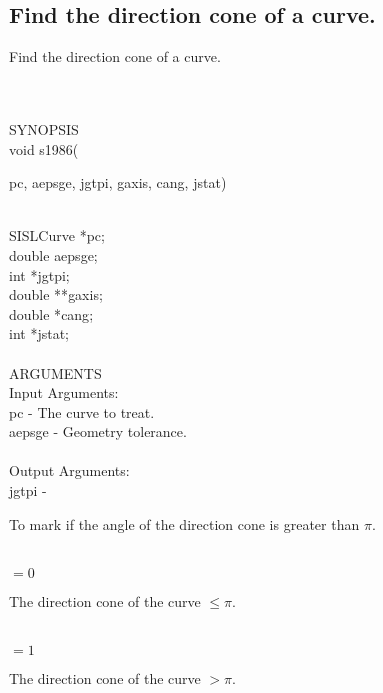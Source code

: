 \subsection{Find the direction cone of a curve.}
\begin{minipg1}
Find the direction cone of a curve.
\end{minipg1} \\ \\
SYNOPSIS\\
        \>void s1986(\begin{minipg3}
          {\fov pc}, {\fov aepsge}, {\fov jgtpi}, {\fov gaxis}, {\fov cang}, {\fov jstat})
        \end{minipg3}\\[0.3ex]
        \>\>    SISLCurve \> *{\fov pc};\\
        \>\>    double    \> {\fov aepsge};\\
        \>\>    int       \> *{\fov jgtpi};\\
        \>\>    double    \> **{\fov gaxis};\\
        \>\>    double    \> *{\fov cang};\\
        \>\>    int       \>  *{\fov jstat};\\
\\
ARGUMENTS\\
        \>Input Arguments:\\
        \>\>    {\fov pc}     \> - \> The curve to treat.\\
        \>\>    {\fov aepsge} \> - \> Geometry tolerance.\\
\\
        \>Output Arguments:\\
        \>\>    {\fov jgtpi} \> - \>
                \begin{minipg2}
                  To mark if the angle of the direction cone is greater than $\pi$.
                \end{minipg2}\\[0.3ex]
                \>\>\>\>\> $= 0$ \begin{minipg5}
                                   The direction cone of the curve $\leq\pi$.
                                 \end{minipg5}\\[0.3ex]
                \>\>\>\>\> $= 1$ \begin{minipg5}
                                   The direction cone of the curve $> \pi$.
                                 \end{minipg5}\\[0.8ex]

